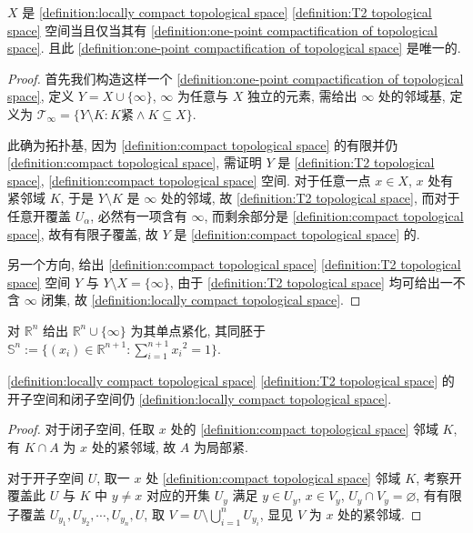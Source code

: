\begin{lemma}
    \(X\) 是 \ref{definition:locally compact topological space} \ref{definition:T2 topological space} 空间当且仅当其有 \ref{definition:one-point compactification of topological space}.
    且此 \ref{definition:one-point compactification of topological space} 是唯一的.

    \begin{proof}
        首先我们构造这样一个 \ref{definition:one-point compactification of topological space}, 定义 \(Y = X \cup \{\infty\}\),
        \(\infty\) 为任意与 \(X\) 独立的元素, 需给出 \(\infty\) 处的邻域基, 定义为 \(\mathcal{T}_\infty = \{Y \setminus K : K \text{紧} \land K \subseteq X\}\).

        此确为拓扑基, 因为 \ref{definition:compact topological space} 的有限并仍 \ref{definition:compact topological space}, 需证明 \(Y\) 是 \ref{definition:T2 topological space}, \ref{definition:compact topological space} 空间.
        对于任意一点 \(x \in X\), \(x\) 处有紧邻域 \(K\), 于是 \(Y \setminus K\) 是 \(\infty\) 处的邻域, 故 \ref{definition:T2 topological space}, 而对于任意开覆盖 \(U_\alpha\),
        必然有一项含有 \(\infty\), 而剩余部分是 \ref{definition:compact topological space}, 故有有限子覆盖, 故 \(Y\) 是 \ref{definition:compact topological space} 的.

        另一个方向, 给出 \ref{definition:compact topological space} \ref{definition:T2 topological space} 空间 \(Y\) 与 \(Y \setminus X = \{\infty\}\),
        由于 \ref{definition:T2 topological space} 均可给出一不含 \(\infty\) 闭集, 故 \ref{definition:locally compact topological space}.
    \end{proof}
\end{lemma}

\begin{example}
    对 \(\mathbb{R}^n\) 给出 \(\mathbb{R}^n \cup \{\infty\}\) 为其单点紧化, 其同胚于 \(\mathbb{S}^n := \{(x_i) \in \mathbb{R}^{n+1} : \sum_{i = 1}^{n+1} {x_i}^2 = 1\}\). 
\end{example}

\begin{lemma}
    \ref{definition:locally compact topological space} \ref{definition:T2 topological space} 的开子空间和闭子空间仍 \ref{definition:locally compact topological space}.

    \begin{proof}
        对于闭子空间, 任取 \(x\) 处的 \ref{definition:compact topological space} 邻域 \(K\), 有 \(K \cap A\) 为 \(x\) 处的紧邻域, 故 \(A\) 为局部紧.

        对于开子空间 \(U\), 取一 \(x\) 处 \ref{definition:compact topological space} 邻域 \(K\), 
        考察开覆盖此 \(U\) 与 \(K\) 中 \(y \neq x\) 对应的开集 \(U_y\) 满足 \(y \in U_y\), \(x \in V_y\), \(U_y \cap V_y = \varnothing\),
        有有限子覆盖 \(U_{y_1}, U_{y_2}, \cdots, U_{y_n}, U\), 取 \(V = U \setminus \bigcup_{i = 1}^n U_{y_i}\), 显见 \(V\) 为 \(x\) 处的紧邻域.
    \end{proof}
\end{lemma}


